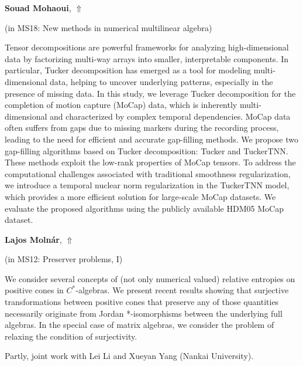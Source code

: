 \documentclass[ILAS2025-program.tex]{subfiles}
\begin{document}
\hypertarget{down0192}{}\begin{ilasabstract}
    
\textbf{Souad Mohaoui},  \hfill \hyperlink{up0192}{$\Uparrow$}
    
    
(in {\color{mstitle}MS18: New methods in numerical multilinear algebra})
        
\mtskip
    Tensor decompositions are powerful frameworks for analyzing high-dimensional data by factorizing multi-way arrays into smaller, interpretable components. In particular, Tucker decomposition has emerged as a tool for modeling multi-dimensional data, helping to uncover underlying patterns, especially in the presence of missing data. In this study, we leverage Tucker decomposition for the completion of motion capture (MoCap) data, which is inherently multi-dimensional and characterized by complex temporal dependencies. MoCap data often suffers from gaps due to missing markers during the recording process, leading to the need for efficient and accurate gap-filling methods. We propose two gap-filling algorithms based on Tucker decomposition: Tucker and TuckerTNN. These methods exploit the low-rank properties of MoCap tensors. To address the computational challenges associated with traditional smoothness regularization, we introduce a temporal nuclear norm regularization in the TuckerTNN model, which provides a more efficient solution for large-scale MoCap datasets. We evaluate the proposed algorithms using the publicly available HDM05 MoCap dataset.
\end{ilasabstract}
    

\hypertarget{down0018}{}\begin{ilasabstract}
    
\textbf{Lajos Molnár},  \hfill \hyperlink{up0018}{$\Uparrow$}
    
    
(in {\color{mstitle}MS12: Preserver problems, I})
        
\mtskip
    We consider several concepts of (not only numerical valued) relative entropies on positive cones in $C^*$-algebras. We present recent results showing that surjective transformations between positive cones that preserve any of those quantities necessarily originate from Jordan *-isomorphisms between the underlying full algebras. In the special case of matrix algebras, we consider the problem of relaxing the condition of surjectivity.

Partly, joint work with Lei Li and Xueyan Yang (Nankai University).

\end{ilasabstract}
    
\end{document}

